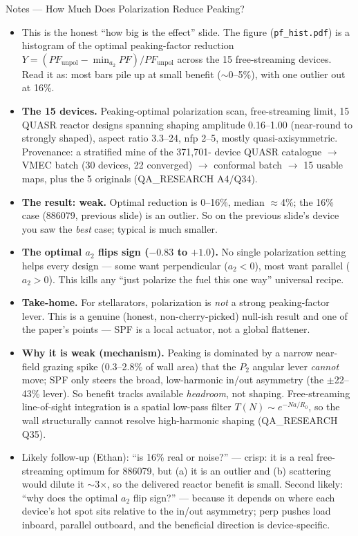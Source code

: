 \documentclass[11pt,aspectratio=169]{beamer}
\begin{document}
\begin{frame}[allowframebreaks]{Notes --- How Much Does Polarization Reduce Peaking?}
{\color{red}\footnotesize
\begin{itemize}
\item This is the honest ``how big is the effect'' slide. The figure (\texttt{pf\_hist.pdf}) is a
      histogram of the optimal peaking-factor reduction $Y=(PF_\text{unpol}-\min_{a_2}PF)/
      PF_\text{unpol}$ across the 15 free-streaming devices. Read it as: most bars pile up at small
      benefit ($\sim$0--5\%), with one outlier out at 16\%.
\item \textbf{The 15 devices.} Peaking-optimal polarization scan, free-streaming limit, 15 QUASR
      reactor designs spanning shaping amplitude 0.16--1.00 (near-round to strongly shaped), aspect
      ratio 3.3--24, nfp 2--5, mostly quasi-axisymmetric. Provenance: a stratified mine of the 371,701-
      device QUASR catalogue $\to$ VMEC batch (30 devices, 22 converged) $\to$ conformal batch $\to$ 15
      usable maps, plus the 5 originals (QA\_RESEARCH A4/Q34).
\item \textbf{The result: weak.} Optimal reduction is 0--16\%, median $\approx$4\%; the 16\% case
      (886079, previous slide) is an outlier. So on the previous slide's device you saw the \emph{best}
      case; typical is much smaller.
\item \textbf{The optimal $a_2$ flips sign ($-0.83$ to $+1.0$).} No single polarization setting helps
      every design --- some want perpendicular ($a_2<0$), most want parallel ($a_2>0$). This kills any
      ``just polarize the fuel this one way'' universal recipe.
\item \textbf{Take-home.} For stellarators, polarization is \emph{not} a strong peaking-factor lever.
      This is a genuine (honest, non-cherry-picked) null-ish result and one of the paper's points ---
      SPF is a local actuator, not a global flattener.
\item \textbf{Why it is weak (mechanism).} Peaking is dominated by a narrow near-field grazing spike
      (0.3--2.8\% of wall area) that the $P_2$ angular lever \emph{cannot} move; SPF only steers the
      broad, low-harmonic in/out asymmetry (the $\pm$22--43\% lever). So benefit tracks available
      \emph{headroom}, not shaping. Free-streaming line-of-sight integration is a spatial low-pass
      filter $T(N)\sim e^{-Na/R_0}$, so the wall structurally cannot resolve high-harmonic shaping
      (QA\_RESEARCH Q35).
\item Likely follow-up (Ethan): ``is 16\% real or noise?'' --- crisp: it is a real free-streaming
      optimum for 886079, but (a) it is an outlier and (b) scattering would dilute it $\sim$3$\times$,
      so the delivered reactor benefit is small. Second likely: ``why does the optimal $a_2$ flip
      sign?'' --- because it depends on where each device's hot spot sits relative to the in/out
      asymmetry; perp pushes load inboard, parallel outboard, and the beneficial direction is
      device-specific.
\end{itemize}
}
\end{frame}
\end{document}
